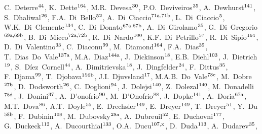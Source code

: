 \begin{flushleft}
C.~Deterre$^\textrm{\scriptsize 44}$,    
K.~Dette$^\textrm{\scriptsize 164}$,    
M.R.~Devesa$^\textrm{\scriptsize 30}$,    
P.O.~Deviveiros$^\textrm{\scriptsize 35}$,    
A.~Dewhurst$^\textrm{\scriptsize 141}$,    
S.~Dhaliwal$^\textrm{\scriptsize 26}$,    
F.A.~Di~Bello$^\textrm{\scriptsize 52}$,    
A.~Di~Ciaccio$^\textrm{\scriptsize 71a,71b}$,    
L.~Di~Ciaccio$^\textrm{\scriptsize 5}$,    
W.K.~Di~Clemente$^\textrm{\scriptsize 134}$,    
C.~Di~Donato$^\textrm{\scriptsize 67a,67b}$,    
A.~Di~Girolamo$^\textrm{\scriptsize 35}$,    
G.~Di~Gregorio$^\textrm{\scriptsize 69a,69b}$,    
B.~Di~Micco$^\textrm{\scriptsize 72a,72b}$,    
R.~Di~Nardo$^\textrm{\scriptsize 100}$,    
K.F.~Di~Petrillo$^\textrm{\scriptsize 57}$,    
R.~Di~Sipio$^\textrm{\scriptsize 164}$,    
D.~Di~Valentino$^\textrm{\scriptsize 33}$,    
C.~Diaconu$^\textrm{\scriptsize 99}$,    
M.~Diamond$^\textrm{\scriptsize 164}$,    
F.A.~Dias$^\textrm{\scriptsize 39}$,    
T.~Dias~Do~Vale$^\textrm{\scriptsize 137a}$,    
M.A.~Diaz$^\textrm{\scriptsize 144a}$,    
J.~Dickinson$^\textrm{\scriptsize 18}$,    
E.B.~Diehl$^\textrm{\scriptsize 103}$,    
J.~Dietrich$^\textrm{\scriptsize 19}$,    
S.~D\'iez~Cornell$^\textrm{\scriptsize 44}$,    
A.~Dimitrievska$^\textrm{\scriptsize 18}$,    
J.~Dingfelder$^\textrm{\scriptsize 24}$,    
F.~Dittus$^\textrm{\scriptsize 35}$,    
F.~Djama$^\textrm{\scriptsize 99}$,    
T.~Djobava$^\textrm{\scriptsize 156b}$,    
J.I.~Djuvsland$^\textrm{\scriptsize 17}$,    
M.A.B.~Do~Vale$^\textrm{\scriptsize 78c}$,    
M.~Dobre$^\textrm{\scriptsize 27b}$,    
D.~Dodsworth$^\textrm{\scriptsize 26}$,    
C.~Doglioni$^\textrm{\scriptsize 94}$,    
J.~Dolejsi$^\textrm{\scriptsize 140}$,    
Z.~Dolezal$^\textrm{\scriptsize 140}$,    
M.~Donadelli$^\textrm{\scriptsize 78d}$,    
J.~Donini$^\textrm{\scriptsize 37}$,    
A.~D'onofrio$^\textrm{\scriptsize 90}$,    
M.~D'Onofrio$^\textrm{\scriptsize 88}$,    
J.~Dopke$^\textrm{\scriptsize 141}$,    
A.~Doria$^\textrm{\scriptsize 67a}$,    
M.T.~Dova$^\textrm{\scriptsize 86}$,    
A.T.~Doyle$^\textrm{\scriptsize 55}$,    
E.~Drechsler$^\textrm{\scriptsize 149}$,    
E.~Dreyer$^\textrm{\scriptsize 149}$,    
T.~Dreyer$^\textrm{\scriptsize 51}$,    
Y.~Du$^\textrm{\scriptsize 58b}$,    
F.~Dubinin$^\textrm{\scriptsize 108}$,    
M.~Dubovsky$^\textrm{\scriptsize 28a}$,    
A.~Dubreuil$^\textrm{\scriptsize 52}$,    
E.~Duchovni$^\textrm{\scriptsize 177}$,    
G.~Duckeck$^\textrm{\scriptsize 112}$,    
A.~Ducourthial$^\textrm{\scriptsize 133}$,    
O.A.~Ducu$^\textrm{\scriptsize 107,x}$,    
D.~Duda$^\textrm{\scriptsize 113}$,    
A.~Dudarev$^\textrm{\scriptsize 35}$,    

\end{flushleft}
